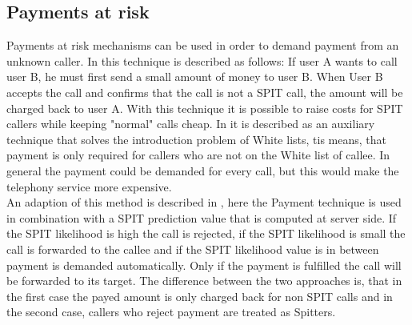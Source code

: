 \documentclass[final
	]{issa}
\begin{document}
\subsection{Payments at risk}
Payments at risk mechanisms can be used in order to demand payment from an unknown caller. In \cite{rfc:5039} this technique is described as follows: If user A wants to call user B, he must first send a small amount of money to user B. When User B accepts the call and confirms that the call is not a SPIT call, the amount will be charged back to user A. With this technique it is possible to raise costs for SPIT callers while keeping "normal" calls cheap. In \cite{rfc:5039} it is described as an auxiliary technique that solves the introduction problem of White lists, tis means, that payment is only required for callers who are not on the White list of callee. In general the payment could be demanded for every call, but this would make the telephony service more expensive.\\An adaption of this method is described in \cite{dipl:unipotsdam}, here the Payment technique is used in combination with a SPIT prediction value that is computed at server side. If the SPIT likelihood is high the call is rejected, if the SPIT likelihood is small the call is forwarded to the callee and if the SPIT likelihood value is in between payment is demanded automatically. Only if the payment is fulfilled the call will be forwarded to its target. The difference between the two approaches is, that in the first case the payed amount is only charged back for non SPIT calls and in the second case, callers who reject payment are treated as Spitters.
\end{document}
